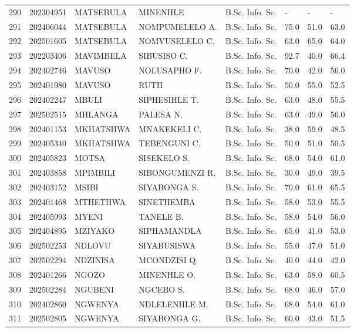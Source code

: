 \documentclass[12pt]{article}
\begin{document}
\begin{longtable}{@{}llllllll@{}}
290 & 202304951 & MATSEBULA & MINENHLE & B.Sc. Info. Sc. & - & - & - \\
291 & 202406044 & MATSEBULA & NOMPUMELELO A. & B.Sc. Info. Sc. & 75.0 & 51.0 & 63.0 \\
292 & 202501605 & MATSEBULA & NOMVUSELELO C. & B.Sc. Info. Sc. & 63.0 & 65.0 & 64.0 \\
293 & 202203406 & MAVIMBELA & SIBUSISO C. & B.Sc. Info. Sc. & 92.7 & 40.0 & 66.4 \\
294 & 202402746 & MAVUSO & NOLUSAPHO F. & B.Sc. Info. Sc. & 70.0 & 42.0 & 56.0 \\
295 & 202401980 & MAVUSO & RUTH & B.Sc. Info. Sc. & 50.0 & 55.0 & 52.5 \\
296 & 202402247 & MBULI & SIPHESIHLE T. & B.Sc. Info. Sc. & 63.0 & 48.0 & 55.5 \\
297 & 202502515 & MHLANGA & PALESA N. & B.Sc. Info. Sc. & 63.0 & 49.0 & 56.0 \\
298 & 202401153 & MKHATSHWA & MNAKEKELI C. & B.Sc. Info. Sc. & 38.0 & 59.0 & 48.5 \\
299 & 202405340 & MKHATSHWA & TEBENGUNI C. & B.Sc. Info. Sc. & 50.0 & 51.0 & 50.5 \\
300 & 202405823 & MOTSA & SISEKELO S. & B.Sc. Info. Sc. & 68.0 & 54.0 & 61.0 \\
301 & 202403858 & MPIMBILI & SIBONGUMENZI R. & B.Sc. Info. Sc. & 30.0 & 49.0 & 39.5 \\
302 & 202403152 & MSIBI & SIYABONGA S. & B.Sc. Info. Sc. & 70.0 & 61.0 & 65.5 \\
303 & 202401468 & MTHETHWA & SINETHEMBA & B.Sc. Info. Sc. & 58.0 & 53.0 & 55.5 \\
304 & 202405993 & MYENI & TANELE B. & B.Sc. Info. Sc. & 58.0 & 54.0 & 56.0 \\
305 & 202404895 & MZIYAKO & SIPHAMANDLA & B.Sc. Info. Sc. & 65.0 & 41.0 & 53.0 \\
306 & 202502253 & NDLOVU & SIYABUSISWA & B.Sc. Info. Sc. & 55.0 & 47.0 & 51.0 \\
307 & 202502294 & NDZINISA & MCONDZISI Q. & B.Sc. Info. Sc. & 40.0 & 44.0 & 42.0 \\
308 & 202401266 & NGOZO & MINENHLE O. & B.Sc. Info. Sc. & 63.0 & 58.0 & 60.5 \\
309 & 202502284 & NGUBENI & NGCEBO S. & B.Sc. Info. Sc. & 68.0 & 46.0 & 57.0 \\
310 & 202402860 & NGWENYA & NDLELENHLE M. & B.Sc. Info. Sc. & 68.0 & 54.0 & 61.0 \\
311 & 202502805 & NGWENYA & SIYABONGA G. & B.Sc. Info. Sc. & 60.0 & 43.0 & 51.5 \\

\end{longtable}
\end{document}
